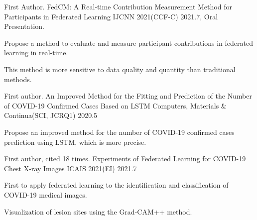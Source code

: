 

\begin{cventries}
	\cventry
	{First Author.} %
	{FedCM: A Real-time Contribution Measurement Method for Participants in Federated Learning} %
	{IJCNN 2021(CCF-C)} %
	{2021.7, Oral Presentation.} %
	{
		\begin{cvitems} %
			\item {Propose a method to evaluate and measure participant contributions in federated learning in real-time.}
			\item {This method is more sensitive to data quality and quantity than traditional methods.}
		\end{cvitems}
	}

	\cventry
	{First author.} %
	{An Improved Method for the Fitting and Prediction of the Number of COVID-19 Confirmed Cases Based on LSTM} %
	{Computers, Materials \& Continua(SCI, JCRQ1)} %
	{2020.5} %
	{
		\begin{cvitems} %
			\item {Propose an improved method for the number of COVID-19 confirmed cases prediction using LSTM, which is more precise.}
		\end{cvitems}
	}

	\cventry
	{First author, cited 18 times.} %
	{Experiments of Federated Learning for COVID-19 Chest X-ray Images} %
	{ICAIS 2021(EI)} %
	{2021.7} %
	{
		\begin{cvitems} %
			\item {First to apply federated learning to the identification and classification of COVID-19 medical images.}
			\item {Visualization of lesion sites using the Grad-CAM++ method.}
		\end{cvitems}
	}

\end{cventries}
